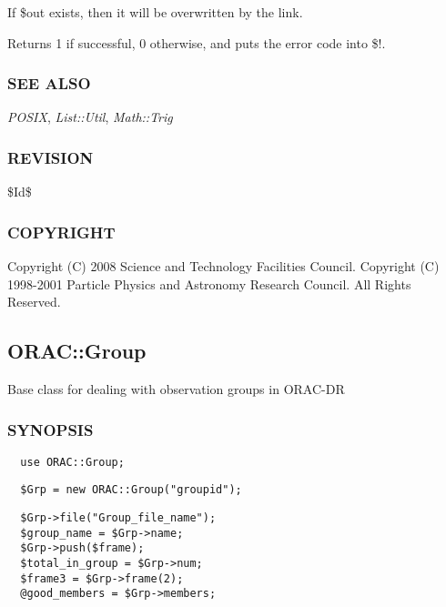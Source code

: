 \begin{description}
\begin{description}
\begin{description}
If \$out exists, then it will be overwritten by the link.



Returns 1 if successful, 0 otherwise, and puts the error code into \$!.

\end{description}
\subsubsection*{SEE ALSO\label{ORAC::General_SEE_ALSO}}


\emph{POSIX},
\emph{List::Util},
\emph{Math::Trig}

\subsubsection*{REVISION\label{ORAC::General_REVISION}}


\$Id\$

\subsubsection*{COPYRIGHT\label{ORAC::General_COPYRIGHT}}


Copyright (C) 2008 Science and Technology Facilities Council.
Copyright (C) 1998-2001 Particle Physics and Astronomy Research
Council. All Rights Reserved.

\subsection{ORAC::Group\label{ORAC::Group}}


Base class for dealing with observation groups in ORAC-DR

\subsubsection*{SYNOPSIS\label{ORAC::Group_SYNOPSIS}}
\begin{verbatim}
  use ORAC::Group;
\end{verbatim}
\begin{verbatim}
  $Grp = new ORAC::Group("groupid");
\end{verbatim}
\begin{verbatim}
  $Grp->file("Group_file_name");
  $group_name = $Grp->name;
  $Grp->push($frame);
  $total_in_group = $Grp->num;
  $frame3 = $Grp->frame(2);
  @good_members = $Grp->members;
\end{verbatim}

\end{description}
\end{description}
